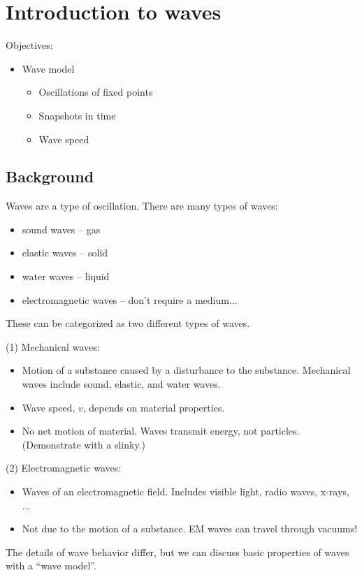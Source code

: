 \section{Introduction to waves}
Objectives:
\begin{itemize}
\item Wave model
  \begin{itemize}
    \item Oscillations of fixed points
    \item Snapshots in time
    \item Wave speed
  \end{itemize}
\end{itemize}

\subsection{Background}
Waves are a type of oscillation. There are many types of waves:
\begin{itemize}
\item sound waves -- gas
\item elastic waves -- solid
\item water waves -- liquid
\item electromagnetic waves -- don't require a medium...
\end{itemize}

These can be categorized as two different types of waves.

(1) Mechanical waves:
\begin{itemize}
\item Motion of a substance caused by a disturbance to the substance. Mechanical waves include sound, elastic, and water waves.
\item Wave speed, $v$, depends on material properties.
\item No net motion of material. Waves transmit energy, not particles. (Demonstrate with a slinky.)
\end{itemize}

(2) Electromagnetic waves:
\begin{itemize}
\item Waves of an electromagnetic field. Includes visible light, radio waves, x-rays, ...
\item Not due to the motion of a substance. EM waves can travel through vacuums!
\end{itemize}

The details of wave behavior differ, but we can discuss basic properties of waves with a ``wave model''.


